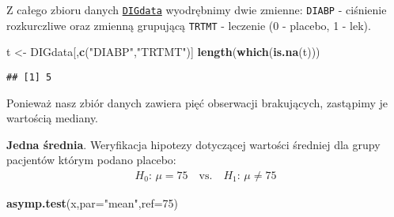 \documentclass[polish,]{book}
\newenvironment{Shaded}{\begin{snugshade}}{\end{snugshade}}
\newcommand{\CommentTok}[1]{\textcolor[rgb]{0.56,0.35,0.01}{\textit{#1}}}
\newcommand{\DataTypeTok}[1]{\textcolor[rgb]{0.13,0.29,0.53}{#1}}
\newcommand{\DecValTok}[1]{\textcolor[rgb]{0.00,0.00,0.81}{#1}}
\newcommand{\KeywordTok}[1]{\textcolor[rgb]{0.13,0.29,0.53}{\textbf{#1}}}
\newcommand{\NormalTok}[1]{#1}
\newcommand{\OperatorTok}[1]{\textcolor[rgb]{0.81,0.36,0.00}{\textbf{#1}}}
\newcommand{\StringTok}[1]{\textcolor[rgb]{0.31,0.60,0.02}{#1}}
\begin{document}
Z całego zbioru danych \href{https://rdrr.io/cran/asympTest/man/DIGdata.html}{\texttt{DIGdata}} wyodrębnimy dwie zmienne: \texttt{DIABP} - ciśnienie rozkurczliwe oraz zmienną grupującą \texttt{TRTMT} - leczenie (0 - placebo, 1 - lek).

\begin{Shaded}
\begin{Highlighting}[]
\NormalTok{t <-}\StringTok{ }\NormalTok{DIGdata[,}\KeywordTok{c}\NormalTok{(}\StringTok{"DIABP"}\NormalTok{,}\StringTok{"TRTMT"}\NormalTok{)]}
\KeywordTok{length}\NormalTok{(}\KeywordTok{which}\NormalTok{(}\KeywordTok{is.na}\NormalTok{(t)))}
\end{Highlighting}
\end{Shaded}

\begin{verbatim}
## [1] 5
\end{verbatim}

Ponieważ nasz zbiór danych zawiera pięć obserwacji brakujących, zastąpimy je wartością mediany.

\begin{Shaded}
\end{Shaded}

\textbf{Jedna średnia}. Weryfikacja hipotezy dotyczącej wartości średniej dla grupy pacjentów którym podano placebo:
\[
\begin{array}{ll}
H_0:\,\mu = 75\quad\mbox{vs.}\quad H_1:\,\mu \neq 75
\end{array}
\]

\begin{Shaded}
\begin{Highlighting}[]
\KeywordTok{asymp.test}\NormalTok{(x,}\DataTypeTok{par=}\StringTok{"mean"}\NormalTok{,}\DataTypeTok{ref=}\DecValTok{75}\NormalTok{)}
\end{Highlighting}
\end{Shaded}
\end{document}
